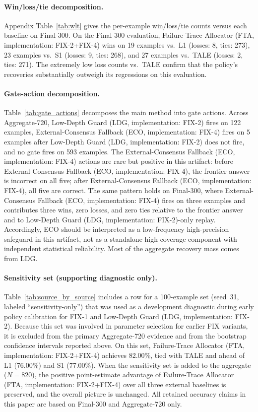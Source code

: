 \paragraph{Win/loss/tie decomposition.}
Appendix Table~\ref{tab:wlt} gives the per-example win/loss/tie counts versus each baseline
on Final-300.
On the Final-300 evaluation, Failure-Trace Allocator (FTA, implementation: FIX-2+FIX-4) wins on 19 examples vs.\ L1 (losses: 8, ties: 273),
23 examples vs.\ S1 (losses: 9, ties: 268), and 27 examples vs.\ TALE (losses: 2, ties: 271).
The extremely low loss counts vs.\ TALE confirm that the policy's recoveries
substantially outweigh its regressions on this evaluation.

\paragraph{Gate-action decomposition.}
Table~\ref{tab:gate_actions} decomposes the main method into gate actions.
Across Aggregate-720, Low-Depth Guard (LDG, implementation: FIX-2) fires on 122 examples, External-Consensus Fallback (ECO, implementation: FIX-4) fires on 5 examples after
Low-Depth Guard (LDG, implementation: FIX-2) does not fire, and no gate fires on 593 examples.
The External-Consensus Fallback (ECO, implementation: FIX-4) actions are rare but positive in this artifact: before External-Consensus Fallback (ECO, implementation: FIX-4), the
frontier answer is incorrect on all five; after External-Consensus Fallback (ECO, implementation: FIX-4), all five are correct.
The same pattern holds on Final-300, where External-Consensus Fallback (ECO, implementation: FIX-4) fires on three examples and
contributes three wins, zero losses, and zero ties relative to the frontier answer
and to Low-Depth Guard (LDG, implementation: FIX-2)-only replay.
Accordingly, ECO should be interpreted as a low-frequency high-precision safeguard in
this artifact, not as a standalone high-coverage component with independent statistical reliability.
Most of the aggregate recovery mass comes from LDG.

\paragraph{Sensitivity set (supporting diagnostic only).}
Table~\ref{tab:source_by_source} includes a row for a 100-example set (seed~31,
labeled ``sensitivity-only'') that was used as a development diagnostic during
early policy calibration for FIX-1 and Low-Depth Guard (LDG, implementation: FIX-2).
Because this set was involved in parameter selection for earlier FIX variants,
it is excluded from the primary Aggregate-720 evidence and from the bootstrap
confidence intervals reported above.
On this set, Failure-Trace Allocator (FTA, implementation: FIX-2+FIX-4) achieves 82.00\%, tied with TALE and ahead of L1 (76.00\%)
and S1 (77.00\%).
When the sensitivity set is added to the aggregate ($N = 820$), the positive
point-estimate advantage of Failure-Trace Allocator (FTA, implementation: FIX-2+FIX-4) over all three external baselines is
preserved, and the overall picture is unchanged.
All retained accuracy claims in this paper are based on Final-300 and Aggregate-720
only.
